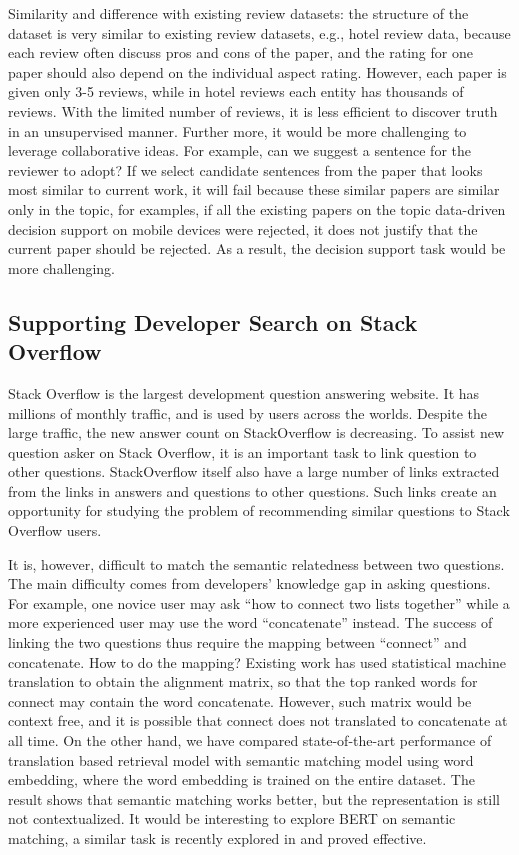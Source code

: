 Similarity and difference with existing review datasets: the structure of the dataset is very similar to existing review datasets, e.g., hotel review data, because each review often discuss pros and cons of the paper, and the rating for one paper should also depend on the individual aspect rating. However, each paper is given only 3-5 reviews, while in hotel reviews each entity has thousands of reviews. With the limited number of reviews, it is less efficient to discover truth in an unsupervised manner. Further more, it would be more challenging to leverage collaborative ideas. For example, can we suggest a sentence for the reviewer to adopt? If we select candidate sentences from the paper that looks most similar to current work, it will fail because these similar papers are similar only in the topic, for examples, if all the existing papers on the topic data-driven decision support on mobile devices were rejected, it does not justify that the current paper should be rejected. As a result, the decision support task would be more challenging. 

\subsection{Supporting Developer Search on Stack Overflow}
\label{sec:cqa}

Stack Overflow is the largest development question answering website. It has millions of monthly traffic, and is used by users across the worlds. Despite the large traffic, the new answer count on StackOverflow is decreasing. To assist new question asker on Stack Overflow, it is an important task to link question to other questions. StackOverflow itself also have a large number of links extracted from the links in answers and questions to other questions. Such links create an opportunity for studying the problem of recommending similar questions to Stack Overflow users. 

It is, however, difficult to match the semantic relatedness between two questions. The main difficulty comes from developers' knowledge gap in asking questions. For example, one novice user may ask ``how to connect two lists together'' while a more experienced user may use the word ``concatenate'' instead. The success of linking the two questions thus require the mapping between ``connect'' and concatenate. How to do the mapping? Existing work has used statistical machine translation to obtain the alignment matrix, so that the top ranked words for connect may contain the word concatenate. However, such matrix would be context free, and it is possible that connect does not translated to concatenate at all time. On the other hand, we have compared state-of-the-art performance of translation based retrieval model with semantic matching model using word embedding, where the word embedding is trained on the entire dataset. The result shows that semantic matching works better, but the representation is still not contextualized. It would be interesting to explore BERT on semantic matching, a similar task is recently explored in \cite{qiao2019understanding} and proved effective.